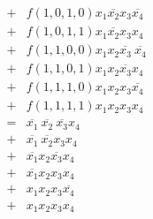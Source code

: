 \documentclass[DIN, pagenumber=false, fontsize=11pt, parskip=half]{scrartcl}
\begin{document}
\begin{enumerate}[label=(\alph*)]
\begin{eqnarray*}
                &+& f(1, 0, 1, 0) x_1 \overline{x_2} x_3 \overline{x_4}\\
                &+& f(1, 0, 1, 1) x_1 \overline{x_2} x_3 x_4\\
                &+& f(1, 1, 0, 0) x_1 x_2 \overline{x_3} \ \overline{x_4}\\
                &+& f(1, 1, 0, 1) x_1 x_2 \overline{x_3} x_4\\
                &+& f(1, 1, 1, 0) x_1 x_2 x_3 \overline{x_4}\\
                &+& f(1, 1, 1, 1) x_1 x_2 x_3 x_4\\
                &=&  \overline{x_1} \ \overline{x_2} \ \overline{x_3} x_4\\
                &+& \overline{x_1} \ \overline{x_2} x_3 x_4\\
                &+& \overline{x_1} x_2 \overline{x_3} x_4\\
                &+& \overline{x_1} x_2 x_3 x_4\\
                &+& x_1 x_2 x_3 \overline{x_4}\\
                &+& x_1 x_2 x_3 x_4\\
            \end{eqnarray*}
    \end{enumerate}
\end{document}

